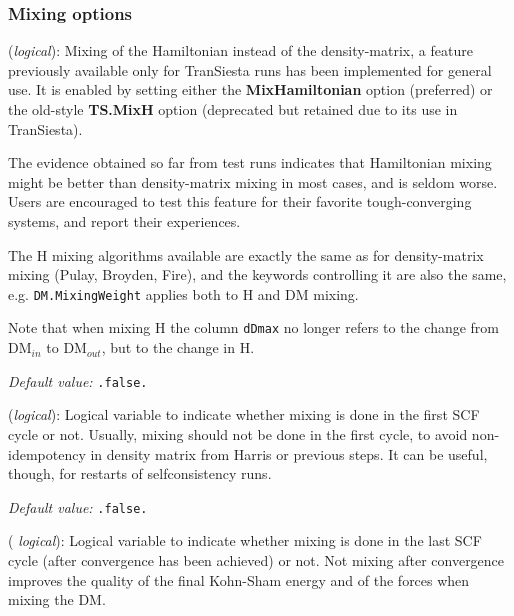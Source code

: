 \documentclass[11pt]{article}
\begin{document}
\subsubsection{Mixing options}


\begin{description}

\item[{\bf MixHamiltonian}] ({\it logical}):
Mixing of the Hamiltonian instead of the density-matrix, a
feature previously available only for TranSiesta runs has been
implemented for general use. It is enabled by setting either the
{\bf MixHamiltonian} option (preferred) or the old-style {\bf TS.MixH}
option (deprecated but retained due to its use in TranSiesta).

The evidence obtained so far from test runs indicates that Hamiltonian
mixing might be better than density-matrix mixing in most cases, and
is seldom worse. Users are encouraged to test this feature for their
favorite tough-converging systems, and report their experiences.

The H mixing algorithms available are exactly the same as for
density-matrix mixing (Pulay, Broyden, Fire), and the keywords
controlling it are also the same, e.g. {\tt DM.MixingWeight} applies
both to H and DM mixing.

Note that when mixing H the column {\tt dDmax} no longer refers to the
change from DM$_{in}$ to DM$_{out}$, but to the change in H.

{\it Default value:} {\tt .false.}

\item[{\bf DM.MixSCF1}] ({\it logical}):
Logical variable to indicate whether mixing is done in the
first SCF cycle or not. Usually, mixing should not be done in
the first cycle, to avoid non-idempotency in density matrix
from Harris or previous steps. It can be useful, though,
for restarts of selfconsistency runs.

{\it Default value:} {\tt .false.}

\item[{\bf SCF.MixAfterConvergence}] ({\it
  logical}):  Logical
  variable to indicate whether mixing is done in the last SCF cycle
  (after convergence has been achieved) or not.  Not mixing after
  convergence improves the quality of the final Kohn-Sham
  energy and of the forces when mixing the DM.


\end{description}
\end{document}

